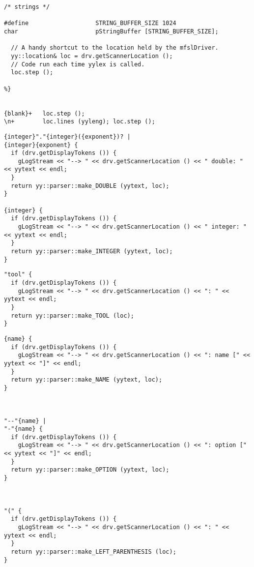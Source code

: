 \begin{lstlisting}[language=Terminal]
/* strings */

#define                   STRING_BUFFER_SIZE 1024
char                      pStringBuffer [STRING_BUFFER_SIZE];

  // A handy shortcut to the location held by the mfslDriver.
  yy::location& loc = drv.getScannerLocation ();
  // Code run each time yylex is called.
  loc.step ();

%}


{blank}+   loc.step ();
\n+        loc.lines (yyleng); loc.step ();
\end{lstlisting}


\begin{lstlisting}[language=Terminal]
{integer}"."{integer}({exponent})? |
{integer}{exponent} {
  if (drv.getDisplayTokens ()) {
    gLogStream << "--> " << drv.getScannerLocation () << " double: " << yytext << endl;
  }
  return yy::parser::make_DOUBLE (yytext, loc);
}

{integer} {
  if (drv.getDisplayTokens ()) {
    gLogStream << "--> " << drv.getScannerLocation () << " integer: " << yytext << endl;
  }
  return yy::parser::make_INTEGER (yytext, loc);
}
\end{lstlisting}


\begin{lstlisting}[language=Terminal]
"tool" {
  if (drv.getDisplayTokens ()) {
    gLogStream << "--> " << drv.getScannerLocation () << ": " << yytext << endl;
  }
  return yy::parser::make_TOOL (loc);
}
\end{lstlisting}


\begin{lstlisting}[language=Terminal]
{name} {
  if (drv.getDisplayTokens ()) {
    gLogStream << "--> " << drv.getScannerLocation () << ": name [" << yytext << "]" << endl;
  }
  return yy::parser::make_NAME (yytext, loc);
}



"--"{name} |
"-"{name} {
  if (drv.getDisplayTokens ()) {
    gLogStream << "--> " << drv.getScannerLocation () << ": option [" << yytext << "]" << endl;
  }
  return yy::parser::make_OPTION (yytext, loc);
}



"(" {
  if (drv.getDisplayTokens ()) {
    gLogStream << "--> " << drv.getScannerLocation () << ": " << yytext << endl;
  }
  return yy::parser::make_LEFT_PARENTHESIS (loc);
}
\end{lstlisting}


